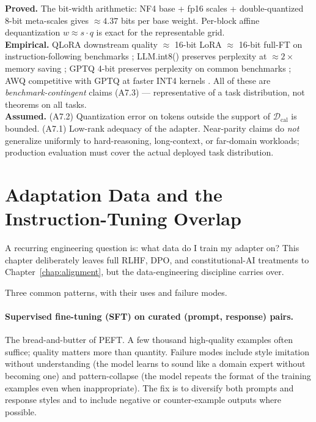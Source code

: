 \begin{provedassumed}
\textbf{Proved.} The bit-width arithmetic: NF4 base + fp16 scales +
double-quantized 8-bit meta-scales gives $\approx 4.37$ bits per base
weight. Per-block affine dequantization $w \approx s \cdot q$ is exact
for the representable grid.\\
\textbf{Empirical.} QLoRA downstream quality $\approx$ 16-bit LoRA
$\approx$ 16-bit full-FT on instruction-following benchmarks
\citep{dettmers2023qlora}; LLM.int8() preserves perplexity
at $\approx 2\times$ memory saving
\citep{dettmers2022llmint8}; GPTQ 4-bit preserves perplexity on
common benchmarks \citep{frantar2023gptq}; AWQ competitive with
GPTQ at faster INT4 kernels \citep{lin2024awq}. All of these are
\emph{benchmark-contingent} claims (A7.3) --- representative of a
task distribution, not theorems on all tasks.\\
\textbf{Assumed.} (A7.2) Quantization error on tokens outside the
support of $\mathcal{D}_{\mathrm{cal}}$ is bounded. (A7.1) Low-rank
adequacy of the adapter. Near-parity claims do \emph{not} generalize
uniformly to hard-reasoning, long-context, or far-domain workloads;
production evaluation must cover the actual deployed task
distribution.
\end{provedassumed}

\section{Adaptation Data and the Instruction-Tuning Overlap}

A recurring engineering question is: what data do I train my adapter
on? This chapter deliberately leaves full RLHF, DPO, and
constitutional-AI treatments to Chapter~\ref{chap:alignment}, but the data-engineering
discipline carries over.

Three common patterns, with their uses and failure modes.

\paragraph{Supervised fine-tuning (SFT) on curated (prompt, response)
pairs.} The bread-and-butter of PEFT. A few thousand high-quality
examples often suffice; quality matters more than quantity. Failure
modes include style imitation without understanding (the model
learns to sound like a domain expert without becoming one) and
pattern-collapse (the model repeats the format of the training
examples even when inappropriate). The fix is to diversify both
prompts and response styles and to include negative or
counter-example outputs where possible.


